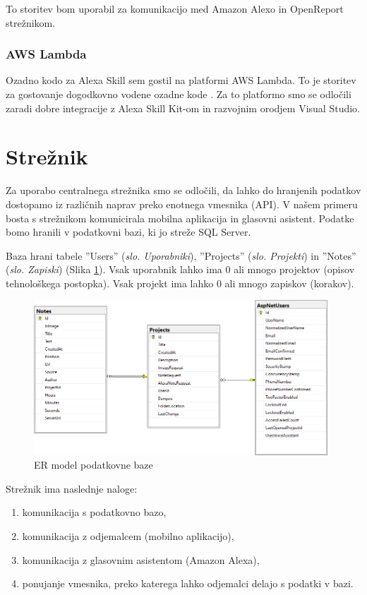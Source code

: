 \documentclass[a4paper, 12pt]{book}
\begin{document}
To storitev bom uporabil za komunikacijo med Amazon Alexo in OpenReport strežnikom.

\subsubsection{AWS Lambda}

Ozadno kodo za Alexa Skill sem gostil na platformi AWS Lambda.
To je storitev za gostovanje dogodkovno vodene ozadne kode \cite{lambda}.
Za to platformo smo se odločili zaradi dobre integracije z Alexa Skill Kit-om in razvojnim orodjem Visual Studio.

\section{Strežnik}

Za uporabo centralnega strežnika smo se odločili, da lahko do hranjenih podatkov dostopamo iz različnih naprav preko enotnega vmesnika (API).
V našem primeru bosta s strežnikom komunicirala mobilna aplikacija in glasovni asistent.
Podatke bomo hranili v podatkovni bazi, ki jo streže SQL Server.

Baza hrani tabele ''Users'' (\textit{slo. Uporabniki}), ''Projects'' (\textit{slo. Projekti}) in ''Notes'' (\textit{slo. Zapiski}) (Slika \ref{er_diagram}).
Vsak uporabnik lahko ima 0 ali mnogo projektov (opisov tehnološkega postopka).
Vsak projekt ima lahko 0 ali mnogo zapiskov (korakov).

\begin{figure}[H]
\begin{center}
\includegraphics[width=11cm]{er_diagram_small}
\end{center}
\caption{ER model podatkovne baze}
\label{er_diagram}
\end{figure}


\noindent Strežnik ima naslednje naloge:
\begin{enumerate}
	\item komunikacija s podatkovno bazo,
	\item komunikacija z odjemalcem (mobilno aplikacijo),
	\item komunikacija z glasovnim asistentom (Amazon Alexa),
	\item ponujanje vmesnika, preko katerega lahko odjemalci delajo s podatki v bazi.
\end{enumerate}
\end{document}
